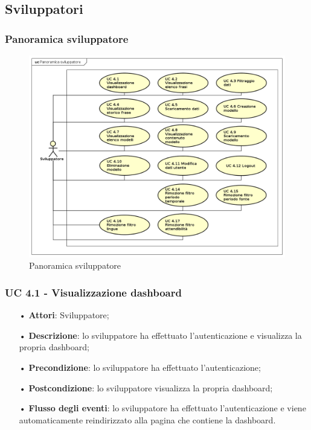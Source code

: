 \subsection{Sviluppatori}
\subsubsection{Panoramica sviluppatore}
\begin{figure}[H]
	\centering
	\includegraphics[width=17cm, keepaspectratio]{img/UC4x.png} 
	\caption{Panoramica sviluppatore}\label{fig:4x}
\end{figure}
\subsubsection{UC 4.1 - Visualizzazione dashboard}
\begin{itemize}
	\item[•]\textbf{Attori}: Sviluppatore;
	\item[•]\textbf{Descrizione}: lo sviluppatore ha effettuato l'autenticazione e visualizza la propria dashboard;
	\item[•]\textbf{Precondizione}: lo sviluppatore ha effettuato l'autenticazione;
	\item[•]\textbf{Postcondizione}: lo sviluppatore visualizza la propria dashboard; 
	\item[•]\textbf{Flusso degli eventi}: lo sviluppatore ha effettuato l'autenticazione e viene automaticamente reindirizzato alla pagina che contiene la dashboard.
\end{itemize}
